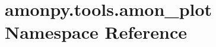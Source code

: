 \hypertarget{namespaceamonpy_1_1tools_1_1amon__plot}{\section{amonpy.\-tools.\-amon\-\_\-plot Namespace Reference}
\label{namespaceamonpy_1_1tools_1_1amon__plot}
}
